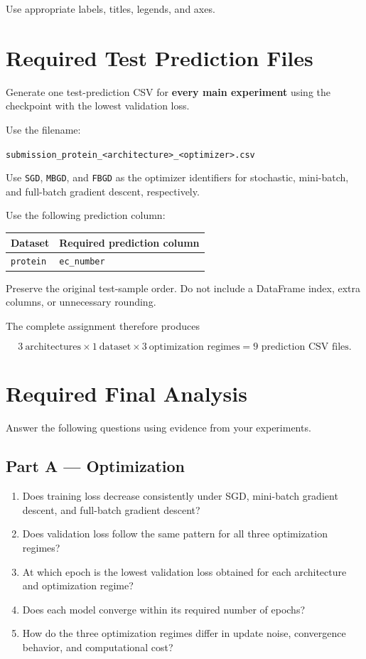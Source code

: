 \documentclass[11pt,a4paper]{article}
\newcommand{\code}[1]{\texttt{#1}}
\begin{document}
Use appropriate labels, titles, legends, and axes.

\section{Required Test Prediction Files}

Generate one test-prediction CSV for \textbf{every main experiment} using the checkpoint with the lowest validation loss.

Use the filename:

\begin{center}
\code{submission\_protein\_<architecture>\_<optimizer>.csv}
\end{center}

Use \code{SGD}, \code{MBGD}, and \code{FBGD} as the optimizer identifiers for stochastic, mini-batch, and full-batch gradient descent, respectively.

Use the following prediction column:

\begin{center}
\begin{tabular}{ll}
\toprule
\textbf{Dataset} & \textbf{Required prediction column} \\
\midrule
\code{protein} & \code{ec\_number} \\
\bottomrule
\end{tabular}
\end{center}

Preserve the original test-sample order. Do not include a DataFrame index, extra columns, or unnecessary rounding.

The complete assignment therefore produces

\[
3\ \text{architectures}\times1\ \text{dataset}\times3\ \text{optimization regimes}
=\boxed{9\text{ prediction CSV files}}.
\]

\section{Required Final Analysis}

Answer the following questions using evidence from your experiments.

\subsection*{Part A --- Optimization}

\begin{enumerate}
    \item Does training loss decrease consistently under SGD, mini-batch gradient descent, and full-batch gradient descent?
    \item Does validation loss follow the same pattern for all three optimization regimes?
    \item At which epoch is the lowest validation loss obtained for each architecture and optimization regime?
    \item Does each model converge within its required number of epochs?
    \item How do the three optimization regimes differ in update noise, convergence behavior, and computational cost?
\end{enumerate}
\end{document}
